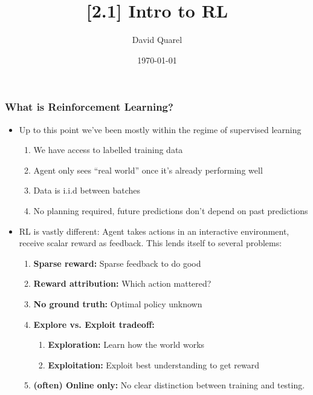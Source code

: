 \title[{[2.1] Intro to RL}]
{{[2.1] Intro to RL}}

 
\author[David Quarel] %
{David Quarel}
 
 
\date[\today] %
{\today}
 
\frame{\titlepage}

\begin{frame}
\frametitle{What is Reinforcement Learning?}
\begin{itemize}
	\item Up to this point we've been mostly within the regime of 
	supervised learning
	\begin{enumerate} 
		\item We have access to labelled training data
		\item  Agent only sees ``real world'' once it's already performing well 
		\item Data is i.i.d between batches 
		\item No planning required, future predictions don't depend on past
		predictions
	\end{enumerate}  
	\pause
	\item RL is vastly different: Agent takes actions in an interactive environment,
	receive scalar reward as feedback. This lends itself to several problems:
	\begin{enumerate}
		\item  \textbf{Sparse reward:} Sparse feedback to do good

		\item \textbf{Reward attribution:} Which action mattered?

		\item \textbf{No ground truth:} Optimal policy unknown

		\item \textbf{Explore vs. Exploit tradeoff:}
		\begin{enumerate}
			\item \textbf{Exploration:} Learn how the world works
			\item \textbf{Exploitation:} Exploit best understanding to get reward
		\end{enumerate} 
	\item \textbf{(often) Online only:} No clear distinction between training and testing.
	\end{enumerate} 
\end{itemize}
	
\end{frame}

